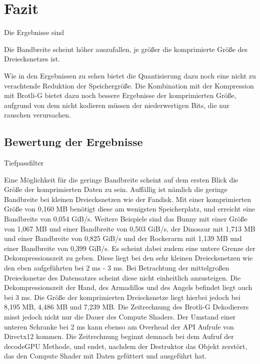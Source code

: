 \section{Fazit}
\label{sec:fazit}
Die Ergebnisse sind 

Die Bandbreite scheint höher auszufallen, je größer die komprimierte Größe des Dreiecksnetzes ist.

Wie in den Ergebnissen zu sehen bietet die Quantisierung dazu noch eine nicht zu verachtende Reduktion der Speichergröße.
Die Kombination mit der Kompression mit Brotli-G bietet dazu noch bessere Ergebnisse der komprimierten Größe, aufgrund von dem nicht kodieren müssen der niederwertigen Bits, die nur rauschen verursachen.

\subsection{Bewertung der Ergebnisse}
\label{subsec:bewertung}
Tiefpassfilter

Eine Möglichkeit für die geringe Bandbreite scheint auf dem ersten Blick die Größe der komprimierten Daten zu sein.
Auffällig ist nämlich die geringe Bandbreite bei kleinen Dreiecksnetzen wie der Fandisk.
Mit einer komprimierten Größe von 0,160 MB benötigt diese am wenigsten Speicherplatz, und erreicht eine Bandbreite von 0,054 GiB/s.
Weitere Beispiele sind das Bunny mit einer Größe von 1,067 MB und einer Bandbreite von 0,503 GiB/s, der Dinosaur mit 1,713 MB und einer Bandbreite von 0,825 GiB/s und der Rockerarm mit 1,139 MB und einer Bandbreite von 0,399 GiB/s.
Es scheint dabei zudem eine untere Grenze der Dekompressionszeit zu geben.
Diese liegt bei den sehr kleinen Dreiecksnetzen wie den eben aufgeführten bei 2 ms - 3 ms.
Bei Betrachtung der mittelgroßen Dreiecksnetze des Datensatzes scheint diese nicht einheitlich anzusteigen.
Die Dekompressionszeit der Hand, des Armadillos und des Angels befindet liegt auch bei 3 ms.
Die Größe der komprimierten Dreiecksnetze liegt hierbei jedoch bei 8,195 MB, 4,486 MB und 7,239 MB.
Die Zeitrechnung des Brotli-G Dekodierers misst jedoch nicht nur die Dauer des Compute Shaders.
Der Umstand einer unteren Schranke bei 2 ms kann ebenso am Overhead der API Aufrufe von Directx12 kommen.
Die Zeitrechnung beginnt demnach bei dem Aufruf der decodeGPU Methode, und endet, nachdem der Destruktor das Objekt zerstört, das den Compute Shader mit Daten gefüttert und ausgeführt hat. \newpage

